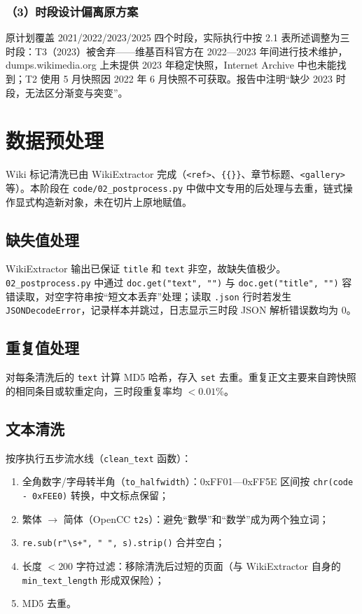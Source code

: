 \documentclass[12pt,a4paper]{article}
\begin{document}
\subsubsection*{（3）时段设计偏离原方案}

原计划覆盖 2021/2022/2023/2025 四个时段，实际执行中按 2.1 表所述调整为三时段：T3（2023）被舍弃——维基百科官方在 2022—2023 年间进行技术维护，dumps.wikimedia.org 上未提供 2023 年稳定快照，Internet Archive 中也未能找到；T2 使用 5 月快照因 2022 年 6 月快照不可获取。报告中注明“缺少 2023 时段，无法区分渐变与突变”。

\section{数据预处理}

Wiki 标记清洗已由 WikiExtractor 完成（\texttt{<ref>}、\texttt{\{\{\}\}}、章节标题、\texttt{<gallery>} 等）。本阶段在 \texttt{code/02\_postprocess.py} 中做中文专用的后处理与去重，链式操作显式构造新对象，未在切片上原地赋值。

\subsection{缺失值处理}

WikiExtractor 输出已保证 \texttt{title} 和 \texttt{text} 非空，故缺失值极少。\texttt{02\_postprocess.py} 中通过 \texttt{doc.get("text", "")} 与 \texttt{doc.get("title", "")} 容错读取，对空字符串按“短文本丢弃”处理；读取 \texttt{.json} 行时若发生 \texttt{JSONDecodeError}，记录样本并跳过，日志显示三时段 JSON 解析错误数均为 0。

\subsection{重复值处理}

对每条清洗后的 \texttt{text} 计算 MD5 哈希，存入 \texttt{set} 去重。重复正文主要来自跨快照的相同条目或软重定向，三时段重复率均 $<0.01\%$。

\subsection{文本清洗}

按序执行五步流水线（\texttt{clean\_text} 函数）：

\begin{enumerate}[leftmargin=2em,itemsep=0pt]
  \item 全角数字/字母转半角（\texttt{to\_halfwidth}）：0xFF01—0xFF5E 区间按 \texttt{chr(code - 0xFEE0)} 转换，中文标点保留；
  \item 繁体 $\rightarrow$ 简体（OpenCC \texttt{t2s}）：避免“數學”和“数学”成为两个独立词；
  \item \texttt{re.sub(r"\textbackslash s+", " ", s).strip()} 合并空白；
  \item 长度 $<200$ 字符过滤：移除清洗后过短的页面（与 WikiExtractor 自身的 \texttt{min\_text\_length} 形成双保险）；
  \item MD5 去重。
\end{enumerate}
\end{document}
